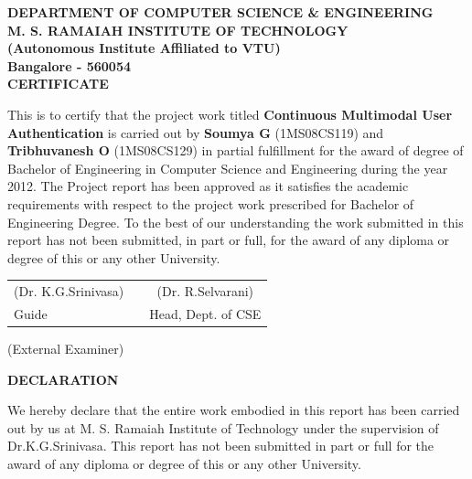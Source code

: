 \documentclass[12pt]{article}			%
\begin{document}
%
%
\begin{center}
\uppercase{\textbf{Department of Computer Science \& Engineering}}\\[2ex]
\uppercase{\textbf{M. S. Ramaiah Institute of Technology}}\\
\textbf{(Autonomous Institute Affiliated to VTU)}\\
\textbf{Bangalore - 560054}\\[30ex]
\textbf{CERTIFICATE}\\[4ex]
\end{center}
This is to certify that the project work titled
\textbf{Continuous Multimodal User Authentication}
is carried out by
\textbf{Soumya G} (1MS08CS119) and
\textbf{Tribhuvanesh O} (1MS08CS129)
in partial fulfillment for the award of degree of Bachelor of
Engineering in Computer Science and Engineering during the year 2012. The Project
report has been approved as it satisfies the academic requirements with respect to
the project work prescribed for Bachelor of Engineering Degree. To the best of our
understanding the work submitted in this report has not been submitted, in part or full, for
the award of any diploma or degree of this or any other University.\\[5ex]
\begin{center}
\begin{table}[htp]
	\centering
	\begin{tabular}{lcc}
	(Dr. K.G.Srinivasa)       &  \hspace{90 mm} & (Dr. R.Selvarani)             \\
	Guide                     &  \hspace{90 mm} & Head, Dept. of CSE             \\ 
	\end{tabular}
\end{table}

\vspace{6 mm}
(External Examiner)
\end{center}

\newpage
\begin{center}
\uppercase{\textbf{\large Declaration}}
\end{center}
We hereby declare that the entire work embodied in this report has been carried out by
us at M. S. Ramaiah Institute of Technology under the supervision of
Dr.K.G.Srinivasa.
This report has not been submitted in part or full for the award of any
diploma or degree of this or any other University.
\end{document}
